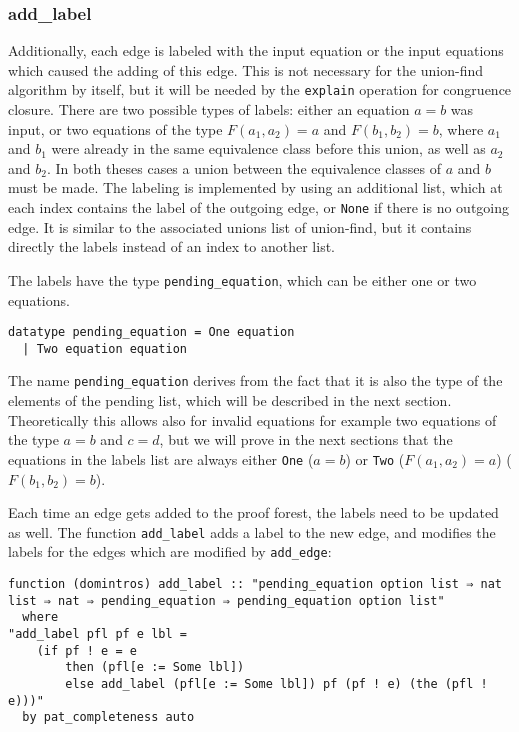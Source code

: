 \subsubsection{add\_label}

Additionally, each edge is labeled with the input equation or the input equations which caused the adding of this edge. This is not necessary for the union-find algorithm by itself, but it will be needed by the \lstinline{explain} operation for congruence closure. There are two possible types of labels: either an equation $a = b$ was input, or two equations of the type $F(a_1, a_2) = a$ and $F(b_1, b_2) = b$, where $a_1$ and $b_1$ were already in the same equivalence class before this union, as well as $a_2$ and $b_2$. In both theses cases a union between the equivalence classes of $a$ and $b$ must be made. The labeling is implemented by using an additional list, which at each index contains the label of the outgoing edge, or \lstinline{None} if there is no outgoing edge. It is similar to the associated unions list of union-find, but it contains directly the labels instead of an index to another list.

The labels have the type \lstinline{pending_equation}, which can be either one or two equations.

\begin{lstlisting}
datatype pending_equation = One equation
  | Two equation equation
\end{lstlisting}

The name \lstinline{pending_equation} derives from the fact that it is also the type of the elements of the pending list, which will be described in the next section. Theoretically this allows also for invalid equations for example two equations of the type $a = b$ and $c = d$, but we will prove in the next sections that the equations in the labels list are always either \lstinline{One} ($a = b$) or \lstinline{Two} ($F(a_1, a_2) = a$) ($F(b_1, b_2) = b$).

Each time an edge gets added to the proof forest, the labels need to be updated as well. The function \lstinline{add_label} adds a label to the new edge, and modifies the labels for the edges which are modified by \lstinline{add_edge}:

\begin{lstlisting}
function (domintros) add_label :: "pending_equation option list ⇒ nat list ⇒ nat ⇒ pending_equation ⇒ pending_equation option list"
  where
"add_label pfl pf e lbl =
    (if pf ! e = e
        then (pfl[e := Some lbl])
        else add_label (pfl[e := Some lbl]) pf (pf ! e) (the (pfl ! e)))"
  by pat_completeness auto
\end{lstlisting}

